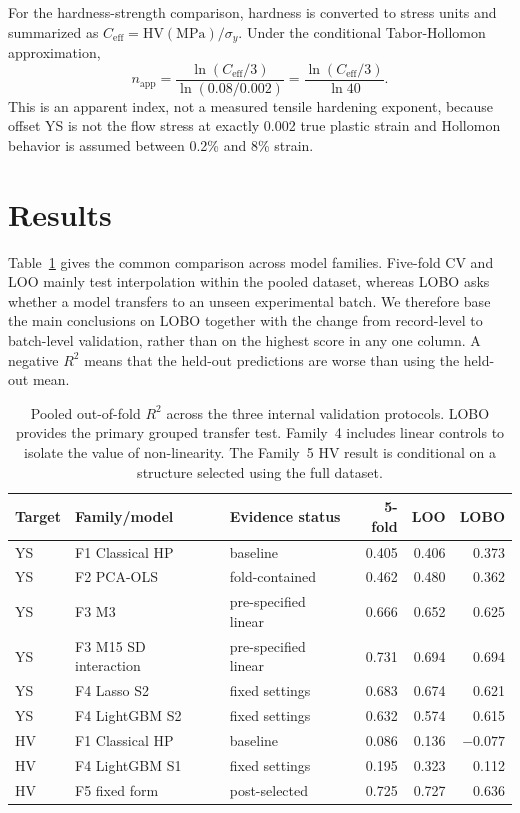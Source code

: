 \documentclass[5p,times,twocolumn]{elsarticle}
\begin{document}
For the hardness-strength comparison, hardness is converted to stress units and summarized as $C_{\mathrm{eff}}=\mathrm{HV(MPa)}/\sigma_y$. Under the conditional Tabor-Hollomon approximation,
\begin{equation}
n_{\mathrm{app}}=\frac{\ln(C_{\mathrm{eff}}/3)}{\ln(0.08/0.002)}
=\frac{\ln(C_{\mathrm{eff}}/3)}{\ln 40}.
\label{eq:napp}
\end{equation}
This is an apparent index, not a measured tensile hardening exponent, because offset YS is not the flow stress at exactly 0.002 true plastic strain and Hollomon behavior is assumed between 0.2\% and 8\% strain.

\section{Results}
\label{sec:results}

Table~\ref{tab:primary} gives the common comparison across model families. Five-fold CV and LOO mainly test interpolation within the pooled dataset, whereas LOBO asks whether a model transfers to an unseen experimental batch. We therefore base the main conclusions on LOBO together with the change from record-level to batch-level validation, rather than on the highest score in any one column. A negative $R^2$ means that the held-out predictions are worse than using the held-out mean.

\begin{table}[t]
\centering
\caption{Pooled out-of-fold $R^2$ across the three internal validation protocols. LOBO provides the primary grouped transfer test. Family~4 includes linear controls to isolate the value of non-linearity. The Family~5 HV result is conditional on a structure selected using the full dataset.}
\label{tab:primary}
\footnotesize
\setlength{\tabcolsep}{3.8pt}
\begin{tabular}{lllrrr}
\toprule
Target & Family/model & Evidence status & 5-fold & LOO & LOBO \\
\midrule
YS & F1 Classical HP & baseline & 0.405 & 0.406 & 0.373 \\
YS & F2 PCA-OLS & fold-contained & 0.462 & 0.480 & 0.362 \\
YS & F3 M3 & pre-specified linear & 0.666 & 0.652 & 0.625 \\
YS & F3 M15 SD interaction & pre-specified linear & 0.731 & 0.694 & 0.694 \\
YS & F4 Lasso S2 & fixed settings & 0.683 & 0.674 & 0.621 \\
YS & F4 LightGBM S2 & fixed settings & 0.632 & 0.574 & 0.615 \\
HV & F1 Classical HP & baseline & 0.086 & 0.136 & $-0.077$ \\
HV & F4 LightGBM S1 & fixed settings & 0.195 & 0.323 & 0.112 \\
HV & F5 fixed form & post-selected & 0.725 & 0.727 & 0.636 \\
\bottomrule
\end{tabular}
\end{table}
\end{document}
